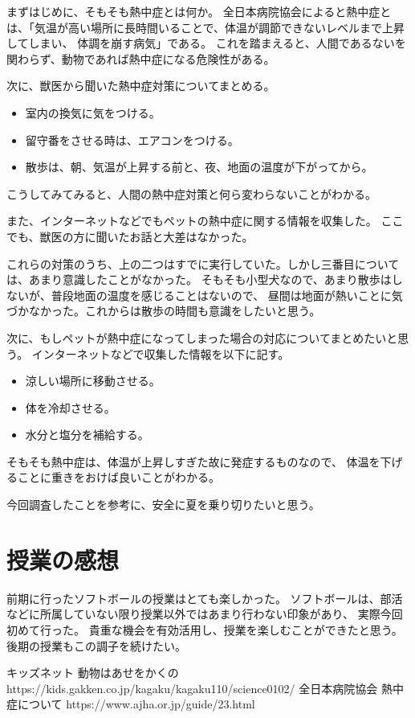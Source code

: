 \documentclass[titlepage]{jsarticle}
\begin{document}
    まずはじめに、そもそも熱中症とは何か。
    全日本病院協会\cite{zbk}によると熱中症とは、「気温が高い場所に長時間いることで、体温が調節できないレベルまで上昇してしまい、
    体調を崩す病気」である。
    これを踏まえると、人間であるないを関わらず、動物であれば熱中症になる危険性がある。

    次に、獣医から聞いた熱中症対策についてまとめる。

    \begin{itemize}
      \item 室内の換気に気をつける。
      \item 留守番をさせる時は、エアコンをつける。
      \item 散歩は、朝、気温が上昇する前と、夜、地面の温度が下がってから。
    \end{itemize}

    こうしてみてみると、人間の熱中症対策と何ら変わらないことがわかる。

    また、インターネットなどでもペットの熱中症に関する情報を収集した。
    ここでも、獣医の方に聞いたお話と大差はなかった。

    これらの対策のうち、上の二つはすでに実行していた。しかし三番目については、あまり意識したことがなかった。
    そもそも小型犬なので、あまり散歩はしないが、普段地面の温度を感じることはないので、
    昼間は地面が熱いことに気づかなかった。これからは散歩の時間も意識をしたいと思う。

    次に、もしペットが熱中症になってしまった場合の対応についてまとめたいと思う。
    インターネットなどで収集した情報を以下に記す。

    \begin{itemize}
      \item 涼しい場所に移動させる。
      \item 体を冷却させる。
      \item 水分と塩分を補給する。
    \end{itemize}

    そもそも熱中症は、体温が上昇しすぎた故に発症するものなので、
    体温を下げることに重きをおけば良いことがわかる。

    今回調査したことを参考に、安全に夏を乗り切りたいと思う。
  \section{授業の感想}
    前期に行ったソフトボールの授業はとても楽しかった。
    ソフトボールは、部活などに所属していない限り授業以外ではあまり行わない印象があり、
    実際今回初めて行った。
    貴重な機会を有効活用し、授業を楽しむことができたと思う。
    後期の授業もこの調子を続けたい。
  \begin{thebibliography}{99}
    \bibitem{} キッズネット 動物はあせをかくの https://kids.gakken.co.jp/kagaku/kagaku110/science0102/
     全日本病院協会 熱中症について https://www.ajha.or.jp/guide/23.html
  \end{thebibliography}
\end{document}
